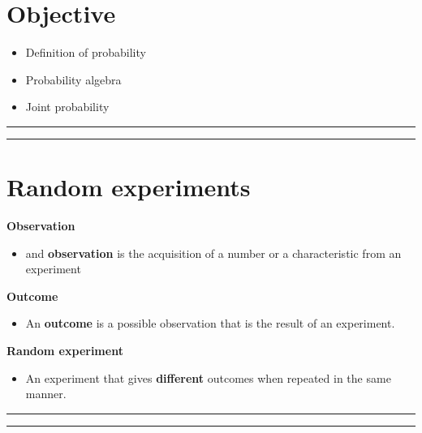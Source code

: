 \documentclass[
]{book}
\providecommand{\tightlist}{%
  \setlength{\itemsep}{0pt}\setlength{\parskip}{0pt}}
\begin{document}
\hypertarget{objective-1}{%
\section{Objective}\label{objective-1}}

\begin{itemize}
\tightlist
\item
  Definition of probability
\item
  Probability algebra
\item
  Joint probability
\end{itemize}

\begin{center}\rule{0.5\linewidth}{0.5pt}\end{center}

\begin{center}\rule{0.5\linewidth}{0.5pt}\end{center}

\hypertarget{random-experiments-1}{%
\section{Random experiments}\label{random-experiments-1}}

\textbf{Observation}

\begin{itemize}
\tightlist
\item
  and \textbf{observation} is the acquisition of a number or a characteristic from an experiment
\end{itemize}

\textbf{Outcome}

\begin{itemize}
\tightlist
\item
  An \textbf{outcome} is a possible observation that is the result of an experiment.
\end{itemize}

\textbf{Random experiment}

\begin{itemize}
\tightlist
\item
  An experiment that gives \textbf{different} outcomes when repeated in the same manner.
\end{itemize}

\begin{center}\rule{0.5\linewidth}{0.5pt}\end{center}

\begin{center}\rule{0.5\linewidth}{0.5pt}\end{center}
\end{document}

